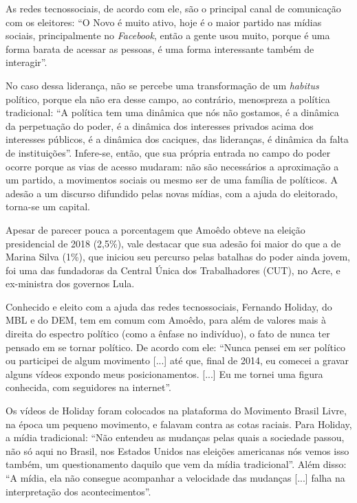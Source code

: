 As redes tecnossociais, de acordo com ele, são o principal canal de
comunicação com os eleitores: ``O Novo é muito ativo, hoje é o maior
partido nas mídias sociais, principalmente no \emph{Facebook}, então a
gente usou muito, porque é uma forma barata de acessar as pessoas, é uma
forma interessante também de interagir''.

No caso dessa liderança, não se percebe uma transformação de um
\emph{habitus} político, porque ela não era desse campo, ao contrário,
menospreza a política tradicional: ``A política tem uma dinâmica que nós
não gostamos, é a dinâmica da perpetuação do poder, é a dinâmica dos
interesses privados acima dos interesses públicos, é a dinâmica dos
caciques, das lideranças, é dinâmica da falta de instituições''.
Infere-se, então, que sua própria entrada no campo do poder ocorre
porque as vias de acesso mudaram: não são necessários a aproximação a um
partido, a movimentos sociais ou mesmo ser de uma família de políticos.
A adesão a um discurso difundido pelas novas mídias, com a ajuda do
eleitorado, torna-se um capital.

Apesar de parecer pouca a porcentagem que Amoêdo obteve na eleição
presidencial de 2018 (2,5\%), vale destacar que sua adesão foi maior do
que a de Marina Silva (1\%), que iniciou seu percurso pelas batalhas do
poder ainda jovem, foi uma das fundadoras da Central Única dos
Trabalhadores (CUT), no Acre, e ex-ministra dos governos Lula.

Conhecido e eleito com a ajuda das redes tecnossociais, Fernando
Holiday, do MBL e do DEM, tem em comum com Amoêdo, para além de valores
mais à direita do espectro político (como a ênfase no indivíduo), o fato
de nunca ter pensado em se tornar político. De acordo com ele: ``Nunca
pensei em ser político ou participei de algum movimento {[}...{]} até
que, final de 2014, eu comecei a gravar alguns vídeos expondo meus
posicionamentos. {[}...{]} Eu me tornei uma figura conhecida, com
seguidores na internet''.

Os vídeos de Holiday foram colocados na plataforma do Movimento Brasil
Livre, na época um pequeno movimento, e falavam contra as cotas raciais.
Para Holiday, a mídia tradicional: ``Não entendeu as mudanças pelas
quais a sociedade passou, não só aqui no Brasil, nos Estados Unidos nas
eleições americanas nós vemos isso também, um questionamento daquilo que
vem da mídia tradicional''. Além disso: ``A mídia, ela não consegue
acompanhar a velocidade das mudanças {[}...{]} falha na interpretação
dos acontecimentos''.

